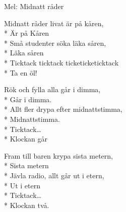 \begin{SongText}
    \begin{SongInfo}
        Mel: Midnatt råder
    \end{SongInfo}
    \begin{SongVerse}
        Midnatt råder livat är på kåren,\\*%
        Är på Kåren\\*%
        Små studenter söka läka såren,\\*%
        Läka såren\\*%
        Ticktack ticktack ticketicketicktack\\*%
        Ta en öl!
    \end{SongVerse}
    \begin{SongVerse}
        Rök och fylla alla går i dimma,\\*%
        Går i dimma.\\*%
        Allt fler drypa efter midnattstimma,\\*%
        Midnattstimma.\\*%
        Ticktack…\\*%
        Klockan går
    \end{SongVerse}
    \begin{SongVerse}
        Fram till baren krypa sista metern,\\*%
        Sista metern\\*%
        Jävla radio, allt går ut i etern,\\*%
        Ut i etern\\*%
        Ticktack…\\*%
        Klockan två.
    \end{SongVerse}
    \begin{SongVerse}

\end{SongVerse}
\end{SongText}
